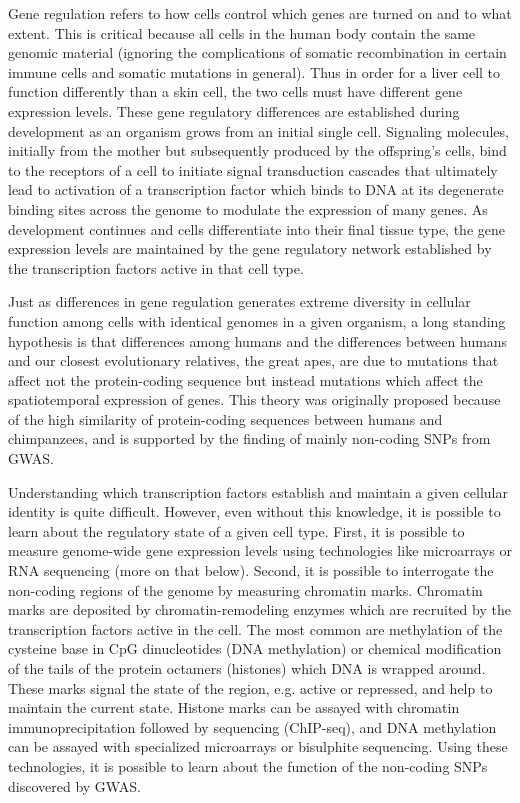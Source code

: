 Gene regulation refers to how cells control which genes are turned on
and to what extent. This is critical because all cells in the human
body contain the same genomic material (ignoring the complications of
somatic recombination in certain immune cells and somatic mutations in
general). Thus in order for a liver cell to function differently than
a skin cell, the two cells must have different gene expression
levels. These gene regulatory differences are established during
development as an organism grows from an initial single
cell. Signaling molecules, initially from the mother but subsequently
produced by the offspring’s cells, bind to the receptors of a cell to
initiate signal transduction cascades that ultimately lead to
activation of a transcription factor which binds to DNA at its
degenerate binding sites across the genome to modulate the expression
of many genes. As development continues and cells differentiate into
their final tissue type, the gene expression levels are maintained by
the gene regulatory network established by the transcription factors
active in that cell type.

Just as differences in gene regulation generates extreme diversity in
cellular function among cells with identical genomes in a given
organism, a long standing hypothesis is that differences among humans
and the differences between humans and our closest evolutionary
relatives, the great apes, are due to mutations that affect not the
protein-coding sequence but instead mutations which affect the
spatiotemporal expression of genes. This theory was originally
proposed because of the high similarity of protein-coding sequences
between humans and chimpanzees, and is supported by the finding of
mainly non-coding SNPs from GWAS.

Understanding which transcription factors establish and maintain a
given cellular identity is quite difficult. However, even without this
knowledge, it is possible to learn about the regulatory state of a
given cell type. First, it is possible to measure genome-wide gene
expression levels using technologies like microarrays or RNA
sequencing (more on that below). Second, it is possible to interrogate
the non-coding regions of the genome by measuring chromatin
marks. Chromatin marks are deposited by chromatin-remodeling enzymes
which are recruited by the transcription factors active in the
cell. The most common are methylation of the cysteine base in CpG
dinucleotides (DNA methylation) or chemical modification of the tails
of the protein octamers (histones) which DNA is wrapped around. These
marks signal the state of the region, e.g. active or repressed, and
help to maintain the current state. Histone marks can be assayed with
chromatin immunoprecipitation followed by sequencing (ChIP-seq), and
DNA methylation can be assayed with specialized microarrays or
bisulphite sequencing. Using these technologies, it is possible to
learn about the function of the non-coding SNPs discovered by GWAS.

